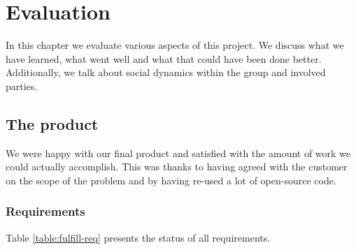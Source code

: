 \chapter{Evaluation} 
\label{ch:evaluation}


In this chapter we evaluate various aspects of this project.
We discuss what we have learned, what went well and what that could have been done better.
Additionally, we talk about social dynamics within the group and involved parties.


\section{The product}
We were happy with our final product and satisfied with the amount of work we could actually accomplish.
This was thanks to having agreed with the customer on the scope of the problem and by having re-used a
lot of open-source code.

\subsection{Requirements}
Table \ref{table:fulfill-req} presents the status of all requirements.

